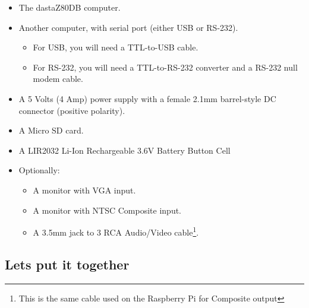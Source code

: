 \begin{itemize}
    \item The dastaZ80DB computer.
    \item Another computer, with serial port (either USB or RS-232).
    \begin{itemize}
        \item For USB, you will need a TTL-to-USB cable.
        \item For RS-232, you will need a TTL-to-RS-232 converter and a RS-232
            null modem cable.
    \end{itemize}
    \item A 5 Volts (4 Amp) power supply with a female 2.1mm barrel-style DC
    connector (positive polarity).
    \item A Micro SD card.
    \item A LIR2032 Li-Ion Rechargeable 3.6V Battery Button Cell
    \item Optionally:
    \begin{itemize}
        \item A monitor with VGA input.
        \item A monitor with NTSC Composite input.
        \item A 3.5mm jack to 3 RCA Audio/Video cable\footnote{This is the same
            cable used on the Raspberry Pi for Composite output}.
    \end{itemize}
\end{itemize}

\subsection{Lets put it together}


